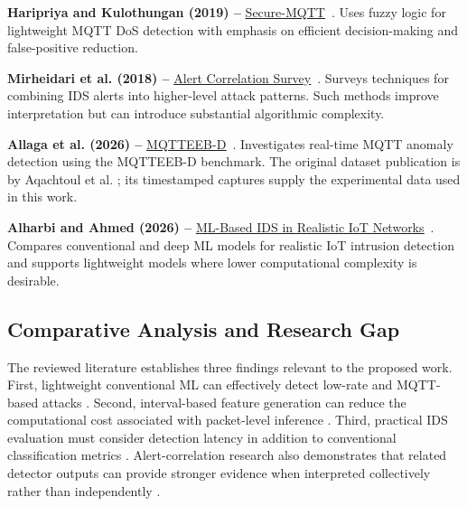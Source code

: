 \documentclass[conference]{IEEEtran}
\newcommand{\bluelink}[2]{\textcolor{blue}{\uline{\href{#1}{#2}}}}
\newcommand{\safeSubsection}[1]{\Needspace{5\baselineskip}\subsection{#1}}
\begin{document}
\medskip

\noindent
\textbf{Haripriya and Kulothungan (2019) -- }
\bluelink{https://link.springer.com/article/10.1186/s13638-019-1402-8}
{Secure-MQTT}~\cite{haripriya2019}.
Uses fuzzy logic for lightweight MQTT DoS detection with emphasis on
efficient decision-making and false-positive reduction.

\medskip

\noindent
\textbf{Mirheidari et al. (2018) -- }
\bluelink{https://arxiv.org/abs/1811.00921}
{Alert Correlation Survey}~\cite{mirheidari2018}.
Surveys techniques for combining IDS alerts into higher-level attack
patterns. Such methods improve interpretation but can introduce
substantial algorithmic complexity.

\medskip

\noindent
\textbf{Allaga et al. (2026) -- }
\bluelink{https://doi.org/10.1016/j.adhoc.2025.104062}
{MQTTEEB-D}~\cite{allaga2026}.
Investigates real-time MQTT anomaly detection using the MQTTEEB-D
benchmark. The original dataset publication is by Aqachtoul et al.
\cite{aqachtoul2025}; its timestamped captures supply the experimental
data used in this work.

\medskip

\noindent
\textbf{Alharbi and Ahmed (2026) -- }
\bluelink{https://arxiv.org/abs/2606.31594}
{ML-Based IDS in Realistic IoT Networks}~\cite{alharbi2026}.
Compares conventional and deep ML models for realistic IoT intrusion
detection and supports lightweight models where lower computational
complexity is desirable.


\fussy

\safeSubsection{Comparative Analysis and Research Gap}

The reviewed literature establishes three findings relevant to the
proposed work. First, lightweight conventional ML can effectively
detect low-rate and MQTT-based attacks
\cite{alfayoumi2023,putro2025}. Second, interval-based feature
generation can reduce the computational cost associated with
packet-level inference \cite{gavric2024}. Third, practical IDS
evaluation must consider detection latency in addition to conventional
classification metrics \cite{puccetti2026}. Alert-correlation research
also demonstrates that related detector outputs can provide stronger
evidence when interpreted collectively rather than independently
\cite{valeur2004,mirheidari2018}.
\end{document}
